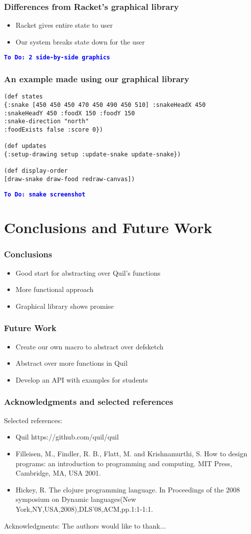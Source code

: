 \documentclass{beamer}
\newcommand{\comment}[1]{{\bf \tt  {#1}}}
\newcommand{\todo}[1]{\textcolor{blue}{\comment{To Do: {#1}}}}
\begin{document}
\begin{frame}
\frametitle{Differences from Racket's graphical library}
\begin{itemize}
\item Racket gives entire state to user
\item Our system breaks state down for the user
\end{itemize}
\todo{2 side-by-side graphics}
\end{frame}

\begin{frame} [fragile]
\frametitle{An example made using our graphical library}
\begin{verbatim}
(def states
{:snake [450 450 450 470 450 490 450 510] :snakeHeadX 450
:snakeHeadY 450 :foodX 150 :foodY 150 
:snake-direction "north"
:foodExists false :score 0})

(def updates
{:setup-drawing setup :update-snake update-snake})

(def display-order
[draw-snake draw-food redraw-canvas])
\end{verbatim}
\todo{snake screenshot}
\end{frame}


\section{Conclusions and Future Work}

\begin{frame}
\frametitle{Conclusions}
\begin{itemize}
\item Good start for abstracting over Quil's functions
\item More functional approach
\item Graphical library shows promise
\end{itemize}
\end{frame}

\begin{frame}
\frametitle{Future Work}
\begin{itemize}
\item Create our own macro to abstract over defsketch
\item Abstract over more functions in Quil
\item Develop an API with examples for students
\end{itemize}
\end{frame}

\begin{frame}
\frametitle{Acknowledgments and selected references}
Selected references:
\begin{itemize}
\item Quil https://github.com/quil/quil
\item Filleisen, M., Findler, R. B., Flatt, M. and Krishnamurthi, S. How to design programs: an introduction to programming and computing. MIT Press, Cambridge, MA, USA 2001.
\item Hickey, R. The clojure programming language. In Proceedings of the 2008 symposium on Dynamic languages(New York,NY,USA,2008),DLS'08,ACM,pp.1:1-1:1.
\end{itemize}
Acknowledgments:
The authors would like to thank...
\end{frame}
\end{document}
